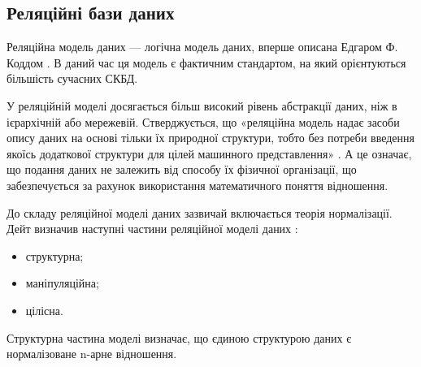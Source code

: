 \subsection{Реляційні бази даних}\label{subsection:relationModel}

Реляційна модель даних — логічна модель даних, вперше описана Едгаром Ф. Коддом \cite{codd1970relational}. В даний час ця модель є фактичним стандартом, на який орієнтуються більшість сучасних СКБД.

У реляційній моделі досягається більш високий рівень абстракції даних, ніж в ієрархічній або мережевій. Стверджується, що «реляційна модель надає засоби опису даних на основі тільки їх природної структури, тобто без потреби введення якоїсь додаткової структури для цілей машинного представлення» \cite{codd1970relational}. А це означає, що подання даних не залежить від способу їх фізичної організації, що забезпечується за рахунок використання математичного поняття відношення.

До складу реляційної моделі даних зазвичай включається теорія нормалізації. Дейт визначив наступні частини реляційної моделі даних \cite{дейт2008введение}:
\begin{itemize}
	\item структурна;
	\item маніпуляційна;
	\item цілісна.
\end{itemize}

Структурна частина моделі визначає, що єдиною структурою даних є нормалізоване n-арне відношення.
